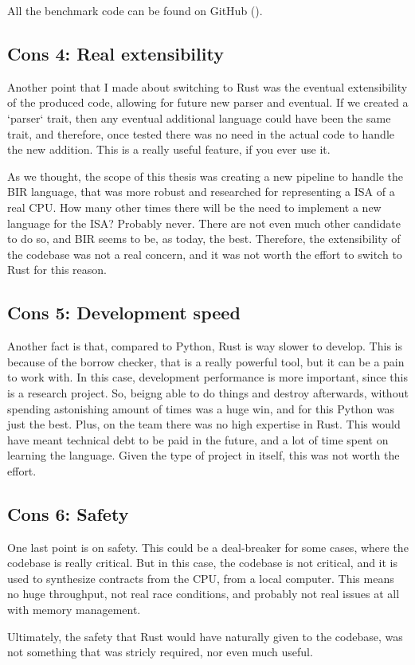 All the benchmark code can be found on GitHub (\cite{benchmark}).

\subsection[short]{Cons 4: Real extensibility}
Another point that I made about switching to Rust was the eventual extensibility
of the produced code, allowing for future new parser and eventual. If we created
a `parser` trait, then any eventual additional language could have been the same
trait, and therefore, once tested there was no need in the actual code to handle
the new addition. This is a really useful feature, if you ever use it.

As we thought, the scope of this thesis was creating a new pipeline to handle
the BIR language, that was more robust and researched for representing a ISA of a
real CPU. How many other times there will be the need to implement a new
language for the ISA? Probably never. There are not even much other candidate to
do so, and BIR seems to be, as today, the best. Therefore, the extensibility of the
codebase was not a real concern, and it was not worth the effort to switch to
Rust for this reason.

\subsection[short]{Cons 5: Development speed}
Another fact is that, compared to Python, Rust is way slower to develop. This is
because of the borrow checker, that is a really powerful tool, but it can be a pain
to work with. In this case, development performance is more important, since
this is a research project. So, beigng able to do things and destroy afterwards,
without spending astonishing amount of times was a huge win, and for this Python
was just the best. Plus, on the team there was no high expertise in Rust. This would
have meant technical debt to be paid in the future, and a lot of time spent on
learning the language. Given the type of project in itself, this was not worth
the effort.

\subsection[short]{Cons 6: Safety}
One last point is on safety. This could be a deal-breaker for some cases, where
the codebase is really critical. But in this case, the codebase is not critical,
and it is used to synthesize contracts from the CPU, from a local computer. This
means no huge throughput, not real race conditions, and probably not real issues
at all with memory management.

Ultimately, the safety that Rust would have naturally given to the codebase, was
not something that was stricly required, nor even much useful.
